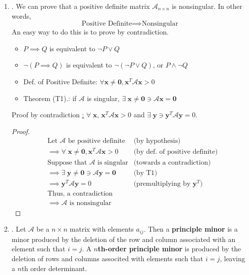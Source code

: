 \documentclass[12pt]{article}
\begin{document}
\begin{enumerate}
\begin{enumerate}
	\item\underline{}.
	We can prove that a positive definite matrix $\mathcal{A}_{n\times n}$ is nonsingular. In other words,
	\[\text{Positive Definite}\implies\text{Nonsingular}\]
	An easy way to do this is to prove by contradiction.
	\begin{itemize}
		\item $P\implies Q$ is equivalent to $\neg P\vee Q$
		\item $\neg(P\implies Q)$ is equivalent to $\neg (\neg P\vee Q)$, or $P\wedge \neg Q$
		\item Def. of Positive Definite: $\forall\mathbf{x}\neq\mathbf{0},\mathbf{x}^{T} \mathcal{A}\mathbf{x}>0$
		\item Theorem (T1).: if $\mathcal{A}$ is singular, $\exists\;\mathbf{x}\neq\mathbf{0}\ni \mathcal{A}\mathbf{x}=\mathbf{0}$
	\end{itemize}
	Proof by contradiction \underline{:} $\forall\;\mathbf{x}$, $\mathbf{x}^T \mathcal{A}\mathbf{x}>0$ and $\exists\; \mathbf{y}\ni \mathbf{y}^T \mathcal{A}\mathbf{y}=0$.
	\begin{proof}
	\begin{align*}
	&\text{Let $\mathcal{A}$ be positive definite}								&\text{(by hypothesis)}					\\
	&\implies\forall\;\mathbf{x}\neq\mathbf{0},\mathbf{x}^T \mathcal{A}\mathbf{x}>0	&\text{(by def. of positive definite)}		\\
	&\text{Suppose that $\mathcal{A}$ is singular}								&\text{(towards a contradiction)}			\\
	&\implies\exists\;\mathbf{y}\neq\mathbf{0}\ni \mathcal{A}\mathbf{y}=\mathbf{0} 	&\text{(by T1)}							\\
	&\implies\mathbf{y}^T \mathcal{A}\mathbf{y}=0 									&\text{(premultiplying by $\mathbf{y}^T$)}	\\
	&\text{Thus, a contradiction}																				\\
	&\implies\mathcal{A}\text{ is nonsingular}							&
	\end{align*}
	\end{proof}
	
	\item\underline{}.
	Let $\mathcal{A}$ be a $n\times n$ matrix with elements $a_{ij}$. Then a \textbf{principle minor} is a minor produced by the deletion of the row and column associated with an element such that $i=j$. A \textbf{$n$th-order principle minor} is produced by the deletion of rows and columns associted with elements such that $i=j$, leaving a $n$th order determinant.
	

\end{enumerate}
\end{enumerate}
\end{document}
